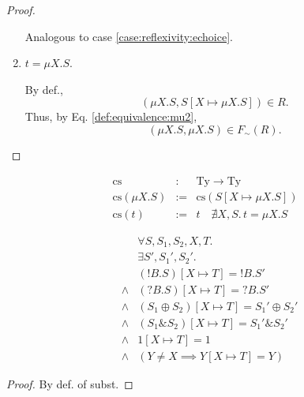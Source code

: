 \documentclass{llncs}
\newcommand*{\Ty}{\mathrm{Ty}}
\newcommand*{\cs}{\mathrm{cs}}
\newcommand*{\sequiv}{\sim}
\newcommand*{\send}{\mathord{!}}
\newcommand*{\recv}{\mathord{?}}
\newcommand*{\echoice}{\oplus}
\newcommand*{\ichoice}{\mathop{\&}}
\renewcommand*{\|}{\;|\;}
\begin{document}
\begin{proof}
\begin{enumerate}
      Analogous to case \ref{case:reflexivity:echoice}.

    \item
      \label{case:reflexivity:mu}
      $t = \mu X.S$.

      By def.,
      \begin{equation*}
        (\mu X.S, S[X \mapsto \mu X.S]) \in R.
      \end{equation*}
      Thus, by Eq. \ref{def:equivalence:mu2},
      \begin{equation*}
        (\mu X.S, \mu X.S) \in F_\sequiv(R).
      \end{equation*}
  \end{enumerate}
\end{proof}

\begin{definition}
  \label{def:complete_substitution}
  \begin{eqnarray*}
    \cs          &\colon& \Ty \to \Ty \\
    \cs(\mu X.S) &:=&     \cs(S[X \mapsto \mu X.S]) \\
    \cs(t)       &:=&     t \quad \nexists X, S.\, t = \mu X.S
  \end{eqnarray*}
\end{definition}

\begin{lemma}
  \label{lemma:substitution_shape}
  \begin{eqnarray*}
    &&      \forall S, S_1, S_2, X, T.\, \\
    &&      \exists S', S_1', S_2'. \\
    &&      (\send B.S)[X \mapsto T] = \send B.S' \\
    &\land& (\recv B.S)[X \mapsto T] = \recv B.S' \\
    &\land& (S_1 \echoice S_2)[X \mapsto T] = S_1' \echoice S_2' \\
    &\land& (S_1 \ichoice S_2)[X \mapsto T] = S_1' \ichoice S_2' \\
    &\land& 1[X \mapsto T] = 1 \\
    &\land& (Y \neq X \implies Y[X \mapsto T] = Y)
  \end{eqnarray*}
\end{lemma}

\begin{proof}
  By def. of subst.
\end{proof}
\end{document}

